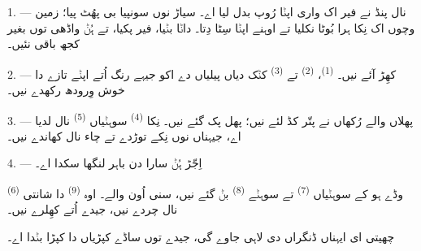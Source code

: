 %


\VUsaut{5.0mm}
\VUsaut{3.0mm}
\VUsaut{3.0mm}
\VUsaut{4.0mm}
\VUsaut{3.0mm}

1. ---  نال پنڈ نے فیر اک واری اپݨا رُوپ بدل لیا اے۔ سیاڑ نوں سونپیا
بی پھُٹ پیا؛ زمین وچوں اک نِکا ہرا بُوٹا نکلیا تے اوہنے اپݨا سِٹا دِتا۔ داݨا
بݨیا، فیر پکیا، تے ہُݨ واڈھی توں بغیر کجھ باقی نئیں۔

2. ---  کھِڑ آئے نیں۔  \textsuperscript{(1)}،
 \textsuperscript{(2)} تے 
\textsuperscript{(3)} کݨک دیاں پیلیاں دے اکو جیہے رنگ اُتے اپݨے تازے
 دا خوش وِرودھ رکھدے نیں۔

3. --- پھلاں والے رُکھاں نے پتّر کڈ لئے نیں؛ پھل پک گئے نیں۔ نِکا
 \textsuperscript{(4)} سوہݨیاں 
\textsuperscript{(5)} نال لدیا اے، جیہناں نوں نِکے توڑدے تے چاء نال کھاندے نیں۔

4. --- اِجّڑ ہُݨ سارا دن باہر لنگھا سکدا اے۔

 \textsuperscript{(6)} وڈے ہو کے سوہݨیاں 
\textsuperscript{(7)} تے سوہݨے  \textsuperscript{(8)} بݨ گئے نیں، سنی
اُون والے۔ اوہ  \textsuperscript{(9)} دا  شانتی نال
چردے نیں، جیدے اُتے  کھِلرے نیں۔

چھیتی ای ایہناں ڈنگراں دی  لاہی جاوے گی، جیدے توں ساڈے کپڑیاں دا
کپڑا بݨدا اے۔

